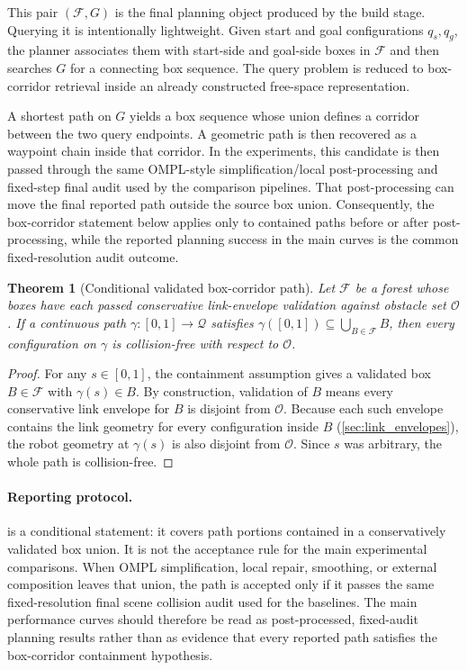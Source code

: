 \documentclass[journal]{IEEEtran}
\newtheorem{theorem}{Theorem}
\newcommand{\calO}{\ensuremath{\mathcal{O}}}
\newcommand{\Q}{\ensuremath{\mathcal{Q}}}
\begin{document}
This pair $(\mathcal{F},G)$ is the final planning object produced by the build
stage. Querying it is intentionally lightweight. Given start and goal
configurations $q_s,q_g$, the planner associates them with start-side and
goal-side boxes in $\mathcal{F}$ and then searches $G$ for a connecting box
sequence. The query problem is reduced to box-corridor
retrieval inside an already constructed free-space representation.

A shortest path on $G$ yields a box sequence whose union defines a corridor
between the two query endpoints. A geometric path is then recovered as a
waypoint chain inside that corridor. In the experiments, this candidate is then
passed through the same OMPL-style simplification/local post-processing and
fixed-step final audit used by the comparison pipelines. That post-processing
can move the final reported path outside the source box union. Consequently,
the box-corridor statement below applies only to contained paths before or after
post-processing, while the reported planning success in the main curves is the
common fixed-resolution audit outcome.

\begin{theorem}[Conditional validated box-corridor path]
\label{thm:corridor_certificate}
Let $\mathcal{F}$ be a forest whose boxes have each passed conservative
link-envelope validation against obstacle set $\calO$. If a continuous path
$\gamma:[0,1]\to\Q$ satisfies
$\gamma([0,1])\subseteq \bigcup_{B\in\mathcal{F}}B$, then every configuration
on $\gamma$ is collision-free with respect to $\calO$.
\end{theorem}

\begin{proof}
For any $s\in[0,1]$, the containment assumption gives a validated box
$B\in\mathcal{F}$ with $\gamma(s)\in B$. By construction, validation of $B$
means every conservative link envelope for $B$ is disjoint from $\calO$.
Because each such envelope contains the link geometry for every configuration
inside $B$ (\cref{sec:link_envelopes}), the robot geometry at $\gamma(s)$ is
also disjoint from $\calO$. Since $s$ was arbitrary, the whole path is
collision-free.
\end{proof}

\paragraph{Reporting protocol.}
 is a conditional statement: it covers path
portions contained in a conservatively validated box union. It is not the
acceptance rule for the main experimental comparisons. When OMPL simplification,
local repair, smoothing, or external composition leaves that union, the path is
accepted only if it passes the same fixed-resolution final scene collision audit
used for the baselines. The main performance curves should therefore be read as
post-processed, fixed-audit planning results rather than as evidence that every
reported path satisfies the box-corridor containment hypothesis.
\end{document}
